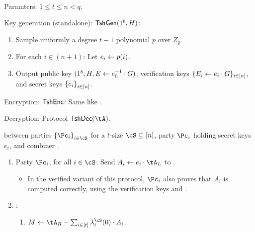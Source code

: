 \begin{algorithm}\label{alg:Tsh}~
	
	\item[Paramters:] $1\le t\le n <q$.
	
	
	\item[Key generation (standalone):] $\mathsf{TshGen}(1^b,H)$:
	\begin{enumerate}
		\item Sample   uniformly a degree $t-1$ polynomial  $p$ over $Z_q$. 
		
		\item For each $i\in (n+1)$: Let $e_i \leftarrow p(i)$.
		
		 
		
		 \item Output public key $(1^b,H,E \leftarrow e_0^{-1} \cdot G)$, verification keys $\{E_i \leftarrow e_i  \cdot G\}_{i\in [n]}$, and secret keys $\set{e_i}_{i\in [n]}$.
	\end{enumerate}
	

	
	\item[Encryption:]  $\mathsf{TshEnc}$:  Same like \EgEnc.
	
	
	
	\item[Decryption:] Protocol $\tdDec(\tA)$.
	
	\begin{description}
		\item[]
	\end{description}
	 between parties  $\set{\Pc_i}_{i\in \cS}$ for a $t$-size $\cS \subseteq [n]$, party $\Pc_i$ holding secret keys $e_i$, and combiner \Cc.
	
	
	
	\begin{enumerate}
		\item Party $\Pc_i$, for all $i\in \cS$:  Send   $A_i \asn e_i \cdot \tA_L$ to \Cc.
		
		\begin{itemize}
			\item In the verified variant of this protocol,  $\Pc_i$ also proves that  $A_i$ is  computed correctly, using  the verification keys and  \piZKPOK{\rEgConsSk}.
		\end{itemize}
		
		\item  \Cc: 
		\begin{enumerate}
			\item $M \asn \tA_R - \sum_{i\in [t]}   \lambda_i^\cS(0) \cdot A_i$.
			

\end{enumerate}
\end{enumerate}
\end{algorithm}
